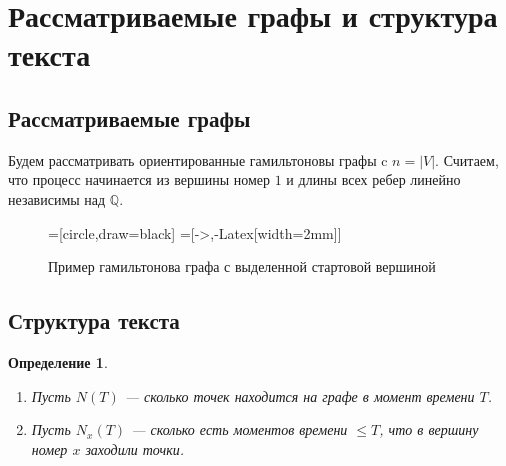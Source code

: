 \documentclass{article}
\newtheorem{definition}{Определение}
\begin{document}
\tableofcontents

\pagebreak

\section{Рассматриваемые графы и структура текста}

\subsection{Рассматриваемые графы}

Будем рассматривать ориентированные гамильтоновы графы c $n = |V|$.
Считаем, что процесс начинается из вершины номер $1$ и длины всех ребер линейно независимы над $\mathbb{Q}$. 

\begin{figure}[!htb]
\begin{center}
=[circle,draw=black]
=[->,-{Latex[width=2mm]}]
\caption{Пример гамильтонова графа с выделенной стартовой вершиной}    
\end{center}
\end{figure}

\subsection{Структура текста}

\begin{definition} $ $
    \begin{enumerate}
        \item Пусть $N(T)$ --- сколько точек находится на графе в момент времени $T$.
        \item Пусть $N_{x}(T)$ --- сколько есть моментов времени $\leq T$, что в вершину номер $x$ заходили точки.
    \end{enumerate}
\end{definition}
\end{document}

